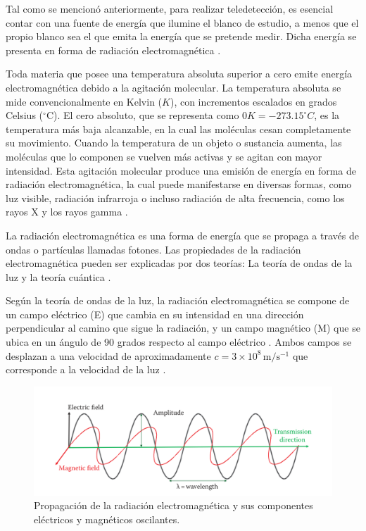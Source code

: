 Tal como se mencionó anteriormente, para realizar teledetección, es esencial contar con una fuente de energía que ilumine el blanco de estudio, a menos que el propio blanco sea el que emita la energía que se pretende medir. Dicha energía se presenta en forma de radiación electromagnética \cite{canada2007fundamentals}.

Toda materia que posee una temperatura absoluta superior a cero emite energía electromagnética debido a la agitación molecular. La temperatura absoluta se mide convencionalmente en Kelvin ($K$), con incrementos escalados en grados Celsius ($^{\circ}$C). El cero absoluto, que se representa como $0K = -273.15 ^{\circ}C$, es la temperatura más baja alcanzable, en la cual las moléculas cesan completamente su movimiento. Cuando la temperatura de un objeto o sustancia aumenta, las moléculas que lo componen se vuelven más activas y se agitan con mayor intensidad. Esta agitación molecular produce una emisión de energía en forma de radiación electromagnética, la cual puede manifestarse en diversas formas, como luz visible, radiación infrarroja o incluso radiación de alta frecuencia, como los rayos X y los rayos gamma \cite{tempfli2009principles}.

La radiación electromagnética es una forma de energía que se propaga a través de ondas o partículas llamadas fotones. Las propiedades de la radiación electromagnética pueden ser explicadas por dos teorías: La teoría de ondas de la luz y la teoría cuántica \cite{chuvieco2016fundamentals}.

Según la teoría de ondas de la luz, la radiación electromagnética se compone de un campo eléctrico (E) que cambia en su intensidad en una dirección perpendicular al camino que sigue la radiación, y un campo magnético (M) que se ubica en un ángulo de 90 grados respecto al campo eléctrico \cite{canada2007fundamentals}. Ambos campos se desplazan a una velocidad de aproximadamente $c = 3 \times 10^8 \, \mathrm{m/s^{-1}}$ que corresponde a la velocidad de la luz \cite{chuvieco2016fundamentals}.

\begin{figure}[H]
    \begin{center}
        \includegraphics[width=1\textwidth]{Images/ComponentesRadiacionElectromagnetica.png}
    \end{center}
    \caption{Propagación de la radiación electromagnética y sus componentes eléctricos y magnéticos oscilantes.}
    \label{fig:ComponentesRadiacionElectromagnetica}
\end{figure}

